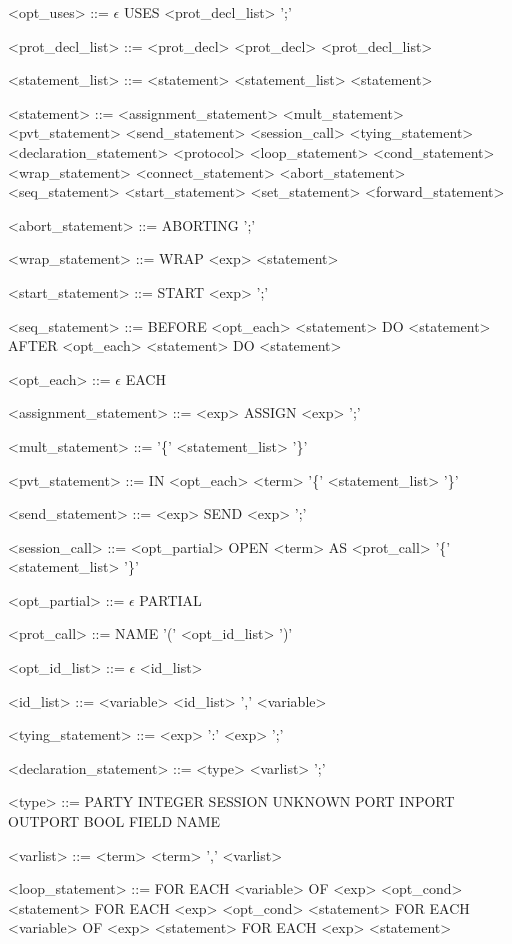 \documentclass{article}
\begin{document}
\begin{grammar}
<opt\_uses> ::= $\epsilon$ \alt USES <prot\_decl\_list> ';'

<prot\_decl\_list> ::= <prot\_decl> \alt <prot\_decl> <prot\_decl\_list>

<statement\_list> ::= <statement> \alt <statement\_list> <statement>

<statement> ::= <assignment\_statement> \alt <mult\_statement> \alt <pvt\_statement> \alt <send\_statement> \alt <session\_call> \alt <tying\_statement> \alt <declaration\_statement> \alt <protocol> \alt <loop\_statement> \alt <cond\_statement> \alt <wrap\_statement> \alt <connect\_statement> \alt <abort\_statement> \alt <seq\_statement> \alt <start\_statement> \alt <set\_statement> \alt <forward\_statement>

<abort\_statement> ::= ABORTING ';'

<wrap\_statement> ::= WRAP <exp> <statement>

<start\_statement> ::= START <exp> ';'

<seq\_statement> ::= BEFORE <opt\_each> <statement> DO <statement> \alt AFTER <opt\_each> <statement> DO <statement>

<opt\_each> ::= $\epsilon$ \alt EACH

<assignment\_statement> ::= <exp> ASSIGN <exp> ';'

<mult\_statement> ::= '\{' <statement\_list> '\}'

<pvt\_statement> ::= IN <opt\_each> <term> '\{' <statement\_list> '\}'

<send\_statement> ::= <exp> SEND <exp> ';'

<session\_call> ::= <opt\_partial> OPEN <term> AS <prot\_call> '\{' <statement\_list> '\}'

<opt\_partial> ::= $\epsilon$ \alt PARTIAL

<prot\_call> ::= NAME '(' <opt\_id\_list> ')'

<opt\_id\_list> ::= $\epsilon$ \alt <id\_list>

<id\_list> ::= <variable> \alt <id\_list> ',' <variable>

<tying\_statement> ::= <exp> ':' <exp> ';'

<declaration\_statement> ::= <type> <varlist> ';'

<type> ::= PARTY \alt INTEGER \alt SESSION \alt UNKNOWN \alt PORT \alt INPORT \alt OUTPORT \alt BOOL \alt FIELD \alt NAME

<varlist> ::= <term> \alt <term> ',' <varlist>

<loop\_statement> ::= FOR EACH <variable> OF <exp> <opt\_cond> <statement> \alt FOR EACH <exp> <opt\_cond> <statement> \alt FOR EACH <variable> OF <exp> <statement> \alt FOR EACH <exp> <statement>


\end{grammar}
\end{document}
